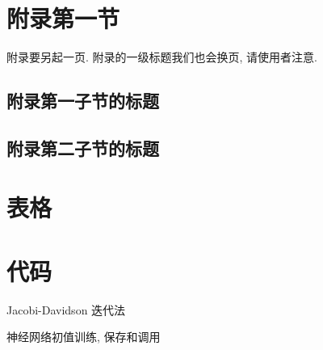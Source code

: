 
\section{附录第一节}

附录要另起一页. 附录的一级标题我们也会换页, 请使用者注意.

\subsection{附录第一子节的标题}

\zhlipsum

\subsection{附录第二子节的标题}

\zhlipsum

\section{表格}


\section{代码}

\begin{listing}
  \caption{Jacobi-Davidson 迭代法}\label{code:JD-iter}
\end{listing}

\begin{longlisting}
	\caption{神经网络初值训练, 保存和调用}\label{code:NN-init}
\end{longlisting}
